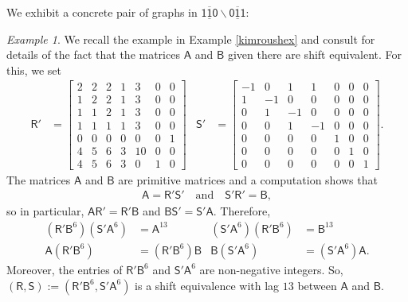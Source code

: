 \documentclass[12pt]{amsbook}%
\theoremstyle{defin}
\theoremstyle{remark}
\newtheorem{examp}[theor]{Example}
\numberwithin{equation}{chapter}
\numberwithin{theor}{section}
\newcommand{\xyzrel}[1]{\mbox{$\overline{\underline{\mathsf{ #1}}}$}}
\begin{document}
We  exhibit a concrete pair of graphs in $\xyzrel{110}\backslash \xyzrel{011}$:

\begin{examp}
We recall the example in Example \ref{kimroushex} and  consult \cite[Section~7]{khkfwr:wcfis} for details of the fact that the matrices $\mathsf{A}$ and $\mathsf{B}$ given there are shift equivalent. 
For this, we set
\begin{align*}
\mathsf{R}' &=\begin{bmatrix} 2 & 2 & 2 & 1 & 3 & 0 & 0 \\ 1& 2 & 2 & 1 & 3 & 0 & 0 \\ 1& 1 & 2 & 1 & 3 & 0 & 0 \\ 1& 1 & 1 & 1 & 3 & 0 & 0 \\ 0& 0 & 0 & 0 & 0 & 0 & 1 \\ 4 & 5 & 6 & 3 & 10 & 0 & 0 \\  4 & 5 & 6 & 3 & 0 & 1 & 0   \end{bmatrix} &
\mathsf{S}' &=\begin{bmatrix} -1 & 0 & 1 & 1 & 0 & 0 & 0 \\ 1& -1 & 0 & 0 & 0 & 0 & 0 \\ 0& 1 & -1 & 0 & 0 & 0 & 0 \\ 0& 0 & 1 & -1 & 0 & 0 & 0 \\ 0& 0 & 0 & 0 & 1 & 0 & 0 \\ 0& 0 & 0 & 0 & 0 & 1 & 0 \\ 0& 0 & 0 & 0 & 0 & 0 & 1   \end{bmatrix}.
\end{align*}
The matrices $\mathsf{A}$ and $\mathsf{B}$ are primitive matrices and a computation shows that 
\begin{align*}
\mathsf{A} = \mathsf{R}'\mathsf{S}' \quad \text{and} \quad \mathsf{S}'\mathsf{R}' = \mathsf{B}, 
\end{align*}
so in particular, $\mathsf{A}\mathsf{R}'=\mathsf{R}'\mathsf{B}$ and $\mathsf{B}\mathsf{S}'=\mathsf{S}'\mathsf{A}$.  Therefore, 
\begin{align*}
(\mathsf{R}'\mathsf{B}^6) (\mathsf{S}'\mathsf{A}^6) &= \mathsf{A}^{13} & (\mathsf{S}'\mathsf{A}^6)(\mathsf{R}'\mathsf{B}^6) &= \mathsf{B}^{13} \\
\mathsf{A} (\mathsf{R}'\mathsf{B}^6) & = (\mathsf{R}'\mathsf{B}^6) \mathsf{B} & \mathsf{B} (\mathsf{S}'\mathsf{A}^6) &= (\mathsf{S}' \mathsf{A}^6) \mathsf{A}.  
\end{align*}
Moreover, the entries of $\mathsf{R}'\mathsf{B}^6$ and $\mathsf{S}'\mathsf{A}^6$ are non-negative integers.  So, $(\mathsf{R},\mathsf{S}):= ( \mathsf{R}'\mathsf{B}^6, \mathsf{S}'\mathsf{A}^6)$ is a shift equivalence with lag $13$ between $\mathsf{A}$ and $\mathsf{B}$.  


\end{examp}
\end{document}
